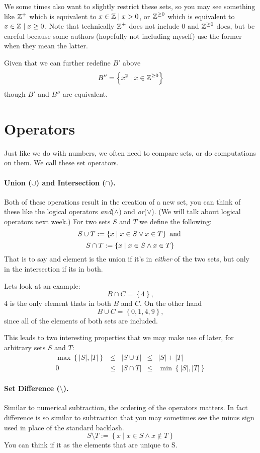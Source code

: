 We some times also want to slightly restrict these sets, so you may see something like $\operatorname{\mathbb{Z}}^+$ which is equivalent to ${x \in \operatorname{\mathbb{Z}} \mid x > 0}$, 
or $\operatorname{\mathbb{Z}}^{\ge0}$ which is equivalent to ${x \in \operatorname{\mathbb{Z}} \mid x \ge 0}$.
Note that technically $\operatorname{\mathbb{Z}}^+$ does not include 0 and $\operatorname{\mathbb{Z}}^{\ge0}$ does, 
but be careful because some authors (hopefully not including myself) use the former when they mean the latter. 

Given that we can further redefine $B'$ above 
\[
B'' = \left\{x^2 \mid x \in \operatorname{\mathbb{Z}}^{\ge0} \right\}
\]
 though $B'$ and $B''$ are equivalent. 
 
\section{Operators}

Just like we do with numbers, we often need to compare sets, or do computations on them.
We call these set operators. 

\paragraph{Union ($\cup$) and Intersection ($\cap$).}
Both of these operations result in the creation of a new set, 
you can think of these like the logical operators \textit{and}($\wedge$) and \textit{or}($\vee$). (We will talk about logical operators next week.)
For two sets $S$ and $T$ we define the following: 
\[
S\cup T := \left\{x \mid x \in S \vee x \in T\right\} \textnormal{ and }
\]\[
S\cap T := \left\{x \mid x \in S \wedge x \in T\right\} \\
\]
That is to say and element is the union if it's in \textit{either} of the two sets, but only in the intersection if its in both. 

Lets look at an example:
\[
B \cap C = \left\{4\right\},
\]
$4$ is the only element thats in both $B$ and $C$. 
On the other hand 
\[
B \cup C = \left\{0,1,4,9\right\},
\]
since all of the elements of both sets are included. 

This leads to two interesting properties that we may make use of later, for arbitrary sets $S$ and $T$: 
\[
\begin{matrix}
\max\left\{|S|, |T|\right\} &\le& |S\cup T| &\le&  |S| + |T|\\
0 &\le& |S\cap T| &\le& \min\left\{|S|, |T|\right\}
\end{matrix}
\]
\paragraph{Set Difference ($\setminus$).}
Similar to numerical subtraction, the ordering of the operators matters. 
In fact difference is so similar to subtraction that you may sometimes see the minus sign used in place of the standard backlash. 
\[
S\setminus T  := \left\{x \mid x \in S \wedge x \notin T\right\} 
\]
You can think if it as the elements that are unique to S. 

